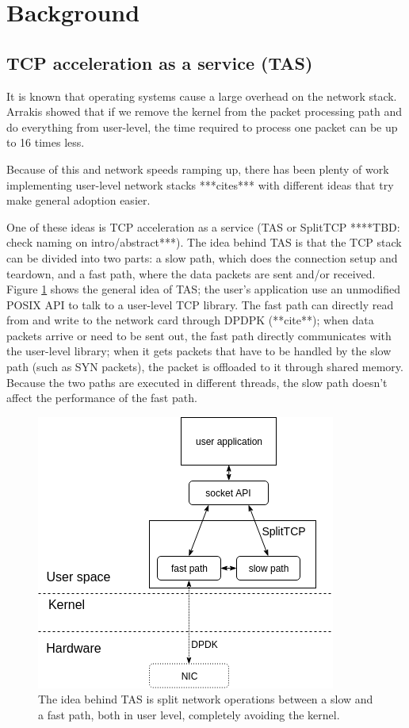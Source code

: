 \section{Background}\label{Background}

%
%

\subsection{TCP acceleration as a service (TAS)}

It is known that operating systems cause a large overhead on the network
stack. Arrakis \cite{peter:arrakis} showed that if we remove the kernel
from the packet processing path and do everything from user-level, the time 
required to process one packet can be up to 16 times less.

Because of this and network speeds ramping up, there has been plenty of work implementing
user-level network stacks ***cites*** with different ideas that try make general adoption
easier.

One of these ideas is TCP acceleration as a service (TAS or SplitTCP  ****TBD: check naming on intro/abstract***).
The idea behind TAS is that the TCP stack can be divided into two parts: a slow path, which does the connection
setup and teardown, and a fast path, where the data packets are sent and/or received. Figure \ref{fig:splittcp} 
shows the general idea of TAS; the user's application use an unmodified POSIX API to talk to a user-level TCP
library. The fast path can directly read from and write to the network card through DPDPK (**cite**); when data packets
arrive or need to be sent out, the fast path directly communicates with the user-level library;
when it gets packets that have to be handled by the slow path (such as SYN packets), the packet 
is offloaded to it through shared memory. Because the two paths are executed in different threads, the slow path doesn't
affect the performance of the fast path.


\begin{figure}
\centering
\includegraphics[width=0.7\columnwidth]{figures/splittcp_default.png}
\caption{The idea behind TAS is split network operations between a slow and a fast path, both in user level, completely
avoiding the kernel.}
\label{fig:splittcp}
\end{figure}


